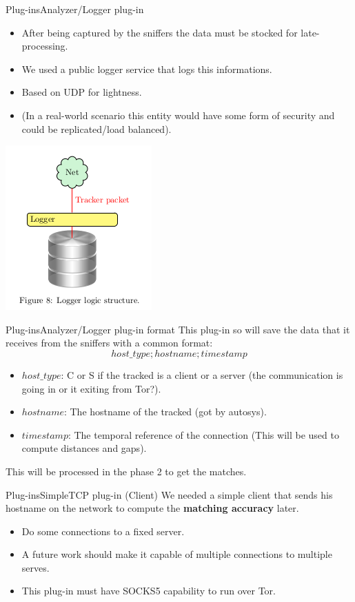 \begin{frame}{Plug-ins}{Analyzer/Logger plug-in}
	\begin{itemize}
		\item After being captured by the sniffers the data must be stocked for late-processing.
		\item We used a public logger service that logs this informations.
		\item Based on UDP for lightness.
		\item (In a real-world scenario this entity would have some form of security and could be replicated/load balanced).
	\end{itemize}
	\begin{center}
		\includegraphics[scale=0.4]{img/logger.png}
	\end{center}
\end{frame}

\begin{frame}{Plug-ins}{Analyzer/Logger plug-in format}
	This plug-in so will save the data that it receives from the sniffers
	with a common format:
	\[ host\_type ; hostname ; timestamp \]
	\begin{itemize}
		\item $host\_type$: C or S if the tracked is a client or a server (the communication is going in or it exiting from Tor?).
		\item $hostname$: The hostname of the tracked (got by autosys).
		\item $timestamp$: The temporal reference of the connection (This will be used to compute distances and gaps).
	\end{itemize}
	This will be processed in the phase 2 to get the matches.
\end{frame}

\begin{frame}{Plug-ins}{SimpleTCP plug-in (Client)}
	We needed a simple client that sends his hostname on the network to compute
	the \textbf{matching accuracy} later.
	\begin{itemize}
		\item Do some connections to a fixed server.
		\item A future work should make it capable of multiple
		      connections to multiple serves.
		\item This plug-in must have SOCKS5 capability to run over Tor.
	\end{itemize}
\end{frame}

